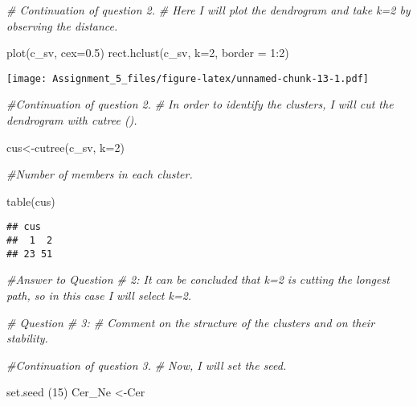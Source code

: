 \documentclass[
]{article}
\newenvironment{Shaded}{\begin{snugshade}}{\end{snugshade}}
\newcommand{\AttributeTok}[1]{\textcolor[rgb]{0.77,0.63,0.00}{#1}}
\newcommand{\CommentTok}[1]{\textcolor[rgb]{0.56,0.35,0.01}{\textit{#1}}}
\newcommand{\DecValTok}[1]{\textcolor[rgb]{0.00,0.00,0.81}{#1}}
\newcommand{\FloatTok}[1]{\textcolor[rgb]{0.00,0.00,0.81}{#1}}
\newcommand{\FunctionTok}[1]{\textcolor[rgb]{0.00,0.00,0.00}{#1}}
\newcommand{\NormalTok}[1]{#1}
\newcommand{\OtherTok}[1]{\textcolor[rgb]{0.56,0.35,0.01}{#1}}
\newcommand{\SpecialCharTok}[1]{\textcolor[rgb]{0.00,0.00,0.00}{#1}}
\begin{document}
\begin{Shaded}
\begin{Highlighting}[]
\CommentTok{\# Continuation of question 2. }
\CommentTok{\# Here I will plot the dendrogram and take k=2 by observing the distance.}

\FunctionTok{plot}\NormalTok{(c\_sv, }\AttributeTok{cex=}\FloatTok{0.5}\NormalTok{)}
\FunctionTok{rect.hclust}\NormalTok{(c\_sv, }\AttributeTok{k=}\DecValTok{2}\NormalTok{, }\AttributeTok{border =} \DecValTok{1}\SpecialCharTok{:}\DecValTok{2}\NormalTok{)}
\end{Highlighting}
\end{Shaded}

\texttt{[image: Assignment\_5\_files/figure-latex/unnamed-chunk-13-1.pdf]}

\begin{Shaded}
\begin{Highlighting}[]
\CommentTok{\#Continuation of question 2. }
\CommentTok{\# In order to identify the clusters, I will cut the dendrogram with cutree (). }

\NormalTok{cus}\OtherTok{\textless{}{-}}\FunctionTok{cutree}\NormalTok{(c\_sv, }\AttributeTok{k=}\DecValTok{2}\NormalTok{)}

\CommentTok{\#Number of members in each cluster.}

\FunctionTok{table}\NormalTok{(cus)}
\end{Highlighting}
\end{Shaded}

\begin{verbatim}
## cus
##  1  2 
## 23 51
\end{verbatim}

\begin{Shaded}
\begin{Highlighting}[]
\CommentTok{\#Answer to Question \# 2: It can be concluded that k=2 is cutting the longest path, so in this case I will select k=2. }
\end{Highlighting}
\end{Shaded}

\begin{Shaded}
\begin{Highlighting}[]
\CommentTok{\# Question \# 3: \# Comment on the structure of the clusters and on their stability. }
\end{Highlighting}
\end{Shaded}

\begin{Shaded}
\begin{Highlighting}[]
\CommentTok{\#Continuation of question 3. }
\CommentTok{\# Now, I will set the seed. }

\FunctionTok{set.seed}\NormalTok{ (}\DecValTok{15}\NormalTok{)}
\NormalTok{Cer\_Ne }\OtherTok{\textless{}{-}}\NormalTok{Cer}
\end{Highlighting}
\end{Shaded}
\end{document}
